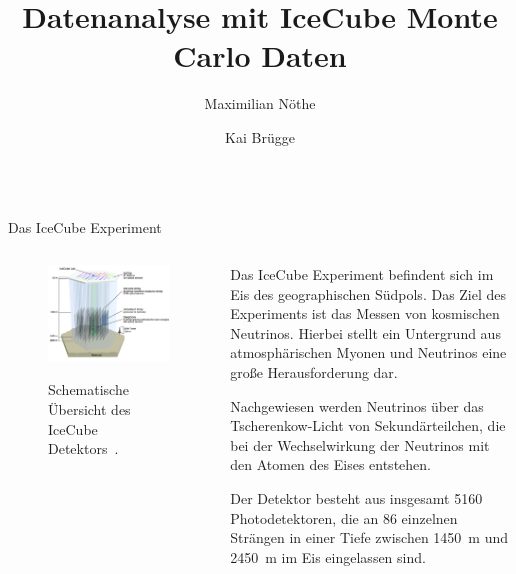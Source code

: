 \documentclass[t]{beamer}
\title{Datenanalyse mit IceCube Monte Carlo Daten}
\author{Maximilian Nöthe \and Kai Brügge}
\institute{%
  \texttt{[image: tudo.pdf]}%
}
\begin{document}
  \begin{columns}[onlytextwidth]%
    \begin{column}{0.5\textwidth}%
      \begin{block}{Das IceCube Experiment}%
        \begin{columns}[onlytextwidth]%
          \begin{column}{0.48\textwidth}%
            \begin{figure}
              \includegraphics[width=\linewidth]{images/icecube_schema.jpg}\\
              \caption{Schematische Übersicht des IceCube Detektors~\cite{icecube_pic}.}
            \end{figure}
          \end{column}\hfill
          \begin{column}{0.48\textwidth}%
            \justifying
            Das IceCube Experiment befindent sich im Eis des geographischen Südpols.
            Das Ziel des Experiments ist das Messen von kosmischen Neutrinos.
            Hierbei stellt ein Untergrund aus atmosphärischen Myonen und Neutrinos eine
            große Herausforderung dar.

            Nachgewiesen werden Neutrinos über das Tscherenkow-Licht von Sekundärteilchen,
            die bei der Wechselwirkung der Neutrinos mit den Atomen des Eises entstehen.

            Der Detektor besteht aus insgesamt \num{5160} Photodetektoren,
            die an \num{86} einzelnen Strängen in einer Tiefe zwischen
            \SI{1450}{\meter} und \SI{2450}{\meter} im Eis eingelassen sind.


\end{column}
\end{columns}
\end{block}
\end{column}
\end{columns}
\end{document}
